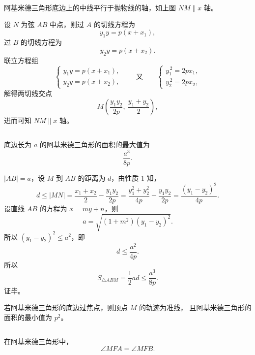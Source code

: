\documentclass{ctexart}
\begin{document}
	\section*{\color{purple}{主要性质：}}
	
	\subsection*{\color{green!60!black}{性质 1}}
	阿基米德三角形底边上的中线平行于抛物线的轴，如上图 $NM\parallel x$ 轴。
	
	\textbf{\color{red}{证明：}}
	设 $N$ 为弦 $AB$ 中点，则过 $A$ 的切线方程为
	\[
	y_1y=p(x+x_1),
	\]
	过 $B$ 的切线方程为
	\[
	y_2y=p(x+x_2).
	\]
	联立方程组
	\[
	\begin{cases}
		y_1y=p(x+x_1),\\
		y_2y=p(x+x_2),
	\end{cases}
	\qquad \text{又}\qquad
	\begin{cases}
		y_1^{\,2}=2px_1,\\
		y_2^{\,2}=2px_2,
	\end{cases}
	\]
	解得两切线交点
	\[
	M\!\left(\dfrac{y_1y_2}{2p},\ \dfrac{y_1+y_2}{2}\right),
	\]
	进而可知 $NM\parallel x$ 轴。
	
	\subsection*{\color{green!60!black}{性质 2}}
	底边长为 $a$ 的阿基米德三角形的面积的最大值为
	\[
	\frac{a^3}{8p}.
	\]
	
	\textbf{\color{red}{证明：}}
	$|AB|=a$，设 $M$ 到 $AB$ 的距离为 $d$，由性质 1 知，
	\[
	d\le |MN|
	=\frac{x_1+x_2}{2}-\frac{y_1y_2}{2p}
	=\frac{y_1^2+y_2^2}{4p}-\frac{y_1y_2}{2p}
	=\frac{(y_1-y_2)^2}{4p}.
	\]
	设直线 $AB$ 的方程为 $x=my+n$，则
	\[
	a=\sqrt{(1+m^2)(y_1-y_2)^2}.
	\]
	所以 $(y_1-y_2)^2\le a^2$，即
	\[
	d\le \frac{a^2}{4p}.
	\]
	所以
	\[
	S_{\triangle ABM}=\frac12ad\le \frac{a^3}{8p}.
	\]
	证毕。
	
	\textbf{\color{red}{特别地：}}
	若阿基米德三角形的底边过焦点，则顶点 $M$ 的轨迹为准线，
	且阿基米德三角形的面积的最小值为 $p^2$。
	
	\subsection*{\color{green!60!black}{性质 3}}
	在阿基米德三角形中，
	\[
	\angle MFA=\angle MFB.
	\]
	
\end{document}
